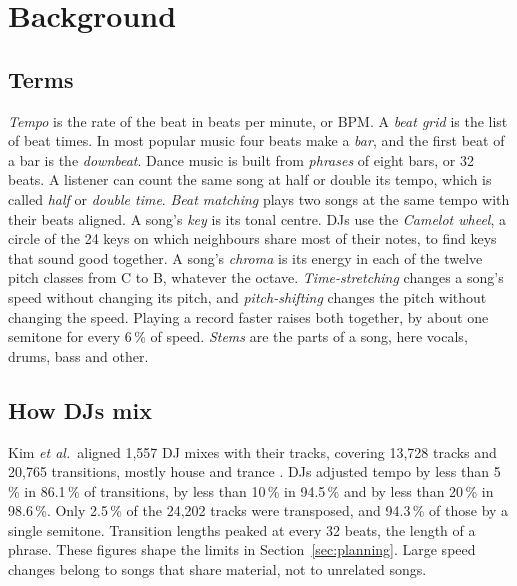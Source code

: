 \documentclass[conference,a4paper]{IEEEtran}
\newcommand{\q}[1]{\textquotedbl{}#1\textquotedbl{}}
\begin{document}
\section{Background}\label{sec:background}

\subsection{Terms}
\emph{Tempo} is the rate of the beat in beats per minute, or BPM. A \emph{beat grid} is the list of
beat times. In most popular music four beats make a \emph{bar}, and the first beat of a bar is the
\emph{downbeat}. Dance music is built from \emph{phrases} of eight bars, or 32 beats. A listener
can count the same song at half or double its tempo, which is called \emph{half} or \emph{double
time}. \emph{Beat matching} plays two songs at the same tempo with their beats aligned. A song's
\emph{key} is its tonal centre. DJs use the \emph{Camelot wheel}, a circle of the 24 keys on which
neighbours share most of their notes, to find keys that sound good together. A song's
\emph{chroma} is its energy in each of the twelve pitch classes from C to B, whatever the octave.
\emph{Time-stretching} changes a song's speed without changing its pitch, and
\emph{pitch-shifting} changes the pitch without changing the speed. Playing a record faster raises
both together, by about one semitone for every 6\,\% of speed. \emph{Stems} are the parts of a
song, here vocals, drums, bass and \q{other}.

\subsection{How DJs mix}
Kim \emph{et al.}\ aligned 1,557 DJ mixes with their tracks, covering 13,728 tracks and 20,765
transitions, mostly house and trance \cite{kim2020}. DJs adjusted tempo by less than 5\,\% in
86.1\,\% of transitions, by less than 10\,\% in 94.5\,\% and by less than 20\,\% in 98.6\,\%. Only
2.5\,\% of the 24,202 tracks were transposed, and 94.3\,\% of those by a single semitone.
Transition lengths peaked at every 32 beats, the length of a phrase. These figures
shape the limits in Section~\ref{sec:planning}. Large speed changes belong to songs that share
material, not to unrelated songs.
\end{document}
